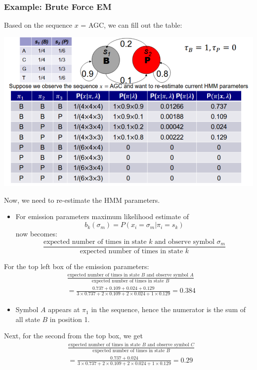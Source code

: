 \documentclass[10pt]{article}
\begin{document}
\subsubsection*{Example: Brute Force EM}
Based on the sequence $x$ = AGC, we can fill out the table:
\begin{center} 
	\includegraphics*[width=\textwidth]{W9_31.png} 
\end{center}
Now, we need to re-estimate the HMM parameters.
\begin{itemize}
	\item For emission parameters maximum likelihood estimate of
	\[b_k(\sigma_m) = P(x_i = \sigma_m | \pi_i = s_k)\]
    now becomes:
    \[\frac{\text{expected number of times in state $k$ and observe symbol $\sigma_m$}}{\text{expected number of times in state $k$}}\]
\end{itemize}
For the top left box of the emission parameters:
\begin{align*}
    &\frac{\text{expected number of times in state $B$ and observe symbol $A$}}{\text{expected number of times in state $B$}}\\
    &= \frac{0.737 + 0.109 + 0.024 + 0.129}{3 \times 0.737 + 2 \times 0.109 + 2 \times 0.024 + 1 \times 0.129} = 0.384
\end{align*}
\begin{itemize}
	\item Symbol $A$ appears at $\pi_1$ in the sequence, hence the numerator is the sum of all state $B$ in position 1.
\end{itemize}
Next, for the second from the top box, we get
\begin{align*}
    &\frac{\text{expected number of times in state $B$ and observe symbol $C$}}{\text{expected number of times in state $B$}}\\
    &= \frac{0.737 + 0.024}{3 \times 0.737 + 2 \times 0.109 + 2 \times 0.024 + 1 \times 0.129} = 0.29
\end{align*}
\end{document}
